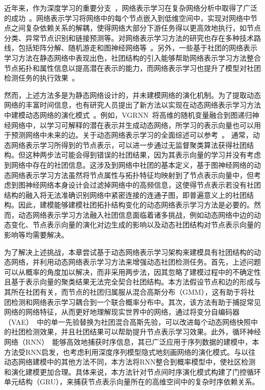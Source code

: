 近年来，作为深度学习的重要分支~\cite{Sun.2021.Xu}，网络表示学习在复杂网络分析中取得了广泛的成功~\cite{8476241,Liu.2021.Lv}。网络表示学习将网络中的每个节点嵌入到低维空间中，实现对网络中节点之间复杂依赖关系的解耦，使得网络大部分下游任务得以更高效地执行，如节点分类、异常节点识别和链接预测等。对网络表示学习方法的研究也存在多种技术路线，包括矩阵分解、随机游走和图神经网络等~\cite{zhang2018network,perozzi2014deepwalk,grover2016node2vec,tang2015line,wang2016structural}。另外，一些基于社团的网络表示学习方法在静态网络中表现出色，社团结构的引入能够帮助网络表示学习方法整合节点拓扑和属性信息以提高潜在表示的能力，而网络表示学习也提升了模型对社团检测任务的执行效果~\cite{cavallari2017learning,choong2018learning,shi2019network,jin2019community}。



然而，上述方法多是为静态网络设计的，并未建模网络的演化机制。为了提取动态网络的丰富时间信息，也有研究人员提出了新方法以实现在动态网络表示学习方法中建模动态网络的演化模式~\cite{goyal2020dyngraph2vec,trivedi2017know,7880588,zhou2018dynamic,Yang.2020.Shen,pareja2020evolvegcn}。例如，VGRNN~\cite{hajiramezanali2019variational}将高维的随机变量融合到图递归神经网络中，以学习可解释的潜在表示并生成动态网络，所学习的表示向量也可以用于预测网络中未来的边。关于动态网络表示学习的全面综述可以参考~\cite{jmlr:v21:19-447}。
通常，动态网络表示学习所得到的节点表示，可以进一步通过无监督聚类算法获得社团结构。但这种两步法可能会得到错误的社团结果，因为其表示向量的学习并没有考虑到网络中存在的社团信息。这涉及到网络中社团的基本定义，基于图神经网络的动态网络表示学习方法虽然将节点属性与拓扑特征均映射到了节点表示向量中，但考虑到图神经网络本身设计会过滤掉网络中的高频信息，这使得节点表示若没有社团结构的融入将无法准确识别网络中紧密连接的连通子图，即普遍意义上的社团结构。因此，建模能够建模社团拓扑结构变化的动态网络表示学习方法是必要的。然而，动态网络表示学习方法融入社团信息面临着诸多挑战，例如动态网络中边的动态变化、节点表示向量的演化对边生成的影响以及动态社团结构对节点表示向量的影响等均需要解决。



为了解决上述挑战，本章尝试基于动态网络表示学习架构来建模具有社团结构的动态网络，并利用动态网络表示学习方法来增强动态社团检测任务。首先，上述问题可以从概率的角度加以解决，而非采用两步法，因其忽略了建模过程中的不确定性且基于表示向量的聚类结果无法完全契合社团结构。本方法假设节点和边的形成与其所在社团有关，而节点的社团归属服从混合高斯分布（GMM），这有助于将社团检测和网络表示学习耦合到一个联合概率分布中。其次，该方法有助于捕捉常见网络的网络特征，从而更好地理解现实世界中的网络，通过将变分自编码器（VAE）~\cite{kingma2013auto}中的单一先验替换为社团混合高斯先验，可以改进每个动态网络快照中的社团检测效果，并且社团结果可以帮助提升节点表示学习效果。此外，循环神经网络（RNN）~\cite{lipton2015critical}能够高效地捕获时序信息，其已广泛应用于序列数据的建模中，本方法受RNN启发，也考虑利用深度序列模型隐式地刻画网络的演化模式。与以往动态网络建模中的其他方法不同，本方法将RNN整合到概率模型中，使社区检测和演化建模更加合理。具体来说，本方法针对节点间时序演化模式构建了门控循环单元结构（GRU），来捕获节点表示向量所在的高维空间中的复杂时序依赖关系。


